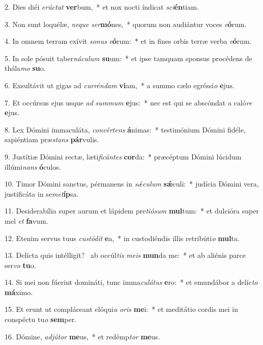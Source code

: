 2. Dies diéi \textit{e}\textit{rúc}\textit{tat} \textbf{ver}bum,~*  et nox nocti índicat \textit{sci}\textbf{én}tiam.\

3. Non sunt loquélæ, \textit{ne}\textit{que} \textit{ser}\textbf{mó}nes,~*  quorum non audiántur voces \textit{e}\textbf{ó}rum.\

4. In omnem terram exívit \textit{so}\textit{nus} \textit{e}\textbf{ó}rum:~*  et in fines orbis terræ verba \textit{e}\textbf{ó}rum.\

5. In sole pósuit taber\textit{ná}\textit{cu}\textit{lum} \textbf{su}um:~*  et ipse tamquam sponsus procédens de thála\textit{mo} \textbf{su}o.\

6. Exsultávit ut gigas ad \textit{cur}\textit{rén}\textit{dam} \textbf{vi}am,~*  a summo cælo egréssi\textit{o} \textbf{e}jus.\

7. Et occúrsus ejus usque \textit{ad} \textit{sum}\textit{mum} \textbf{e}jus:~*  nec est qui se abscóndat a caló\textit{re} \textbf{e}jus.\

8. Lex Dómini immaculáta, \textit{con}\textit{vér}\textit{tens} \textbf{á}nimas:~*  testimónium Dómini fidéle, sapiéntiam præ\textit{stans} \textbf{pár}vulis.\

9. Justítiæ Dómini rectæ, læti\textit{fi}\textit{cán}\textit{tes} \textbf{cor}da:~*  præcéptum Dómini lúcidum illúmi\textit{nans} \textbf{ó}culos.\

10. Timor Dómini sanctus, pérmanens in \textit{sǽ}\textit{cu}\textit{lum} \textbf{sǽ}culi:~*  judícia Dómini vera, justificáta in se\textit{met}\textbf{íp}sa.\

11. Desiderabília super aurum et lápidem pre\textit{ti}\textit{ó}\textit{sum} \textbf{mul}tum:~*  et dulcióra super mel \textit{et} \textbf{fa}vum.\

12. Etenim servus tuus \textit{cus}\textit{tó}\textit{dit} \textbf{e}a,~*  in custodiéndis illis retribúti\textit{o} \textbf{mul}ta.\

13. Delícta quis intélligit? \dag\  ab occúl\textit{tis} \textit{me}\textit{is} \textbf{mun}da me:~*  et ab aliénis parce ser\textit{vo} \textbf{tu}o.\

14. Si mei non fúerint domináti, tunc imma\textit{cu}\textit{lá}\textit{tus} \textbf{e}ro:~*  et emundábor a delíc\textit{to} \textbf{má}ximo.\

15. Et erunt ut compláceant elóqui\textit{a} \textit{o}\textit{ris} \textbf{me}i:~*  et meditátio cordis mei in conspéctu tu\textit{o} \textbf{sem}per.\

16. Dómine, \textit{ad}\textit{jú}\textit{tor} \textbf{me}us,~*  et redémp\textit{tor} \textbf{me}us.\

